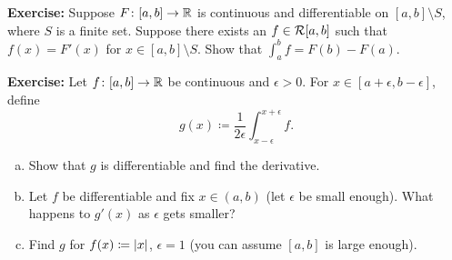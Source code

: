 \documentclass[10pt,aspectratio=169]{beamer}
\begin{document}
\begin{frame}

\textbf{Exercise:}
Suppose $F \colon [a,b] \to {\mathbb{R}}$ is continuous and differentiable
on $[a,b] \setminus S$, where $S$ is a finite set.
\pause
Suppose there
exists an $f \in {\mathcal{R}}[a,b]$ such that $f(x) = F'(x)$ for $x \in [a,b]
\setminus S$.
\pause
Show that
$\int_a^b f = F(b)-F(a)$.

%

\pause
\medskip

\textbf{Exercise:}
Let $f \colon [a,b] \to {\mathbb{R}}$ be continuous and $\epsilon > 0$.
For $x \in [a+\epsilon,b-\epsilon]$, define
\begin{equation*}
g(x) \coloneqq \frac{1}{2\epsilon} \int_{x-\epsilon}^{x+\epsilon} f .
\end{equation*}
\begin{enumerate}[a)]
\item\pause
Show that $g$ is differentiable and find the derivative.
\item\pause
Let $f$ be differentiable and fix $x \in (a,b)$ (let $\epsilon$
be small enough).  What happens to $g'(x)$ as $\epsilon$ gets smaller?
\item\pause
Find $g$ for $f(x) \coloneqq \left\lvert {x} \right\rvert$, $\epsilon = 1$ (you can assume 
$[a,b]$ is large enough).
\end{enumerate}

\end{frame}
\end{document}
